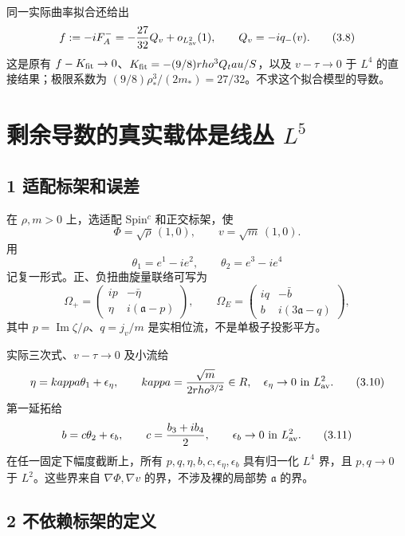 \documentclass[UTF8,11pt,openany,oneside,fontset=none]{ctexbook}
\begin{document}
同一实际曲率拟合还给出 \[
 f:=-iF_A^-=-\frac{27}{32}Q_v+o_{L^2_{\rm av}}(1),
 \qquad Q_v=-iq_-(v).
 \tag{3.8}\label{eq:r3:8}
\] 这是原有 \(f-K_{\rm fit}\to0\)、\(K_{\rm fit}=-(9/8)\rho^3Q_\tau/S\)，以及 \(v-\tau\to0\) 于 \(L^4\) 的直接结果；极限系数为 \((9/8)\rho_*^3/(2m_*)=27/32\)。不求这个拟合模型的导数。

\section{\texorpdfstring{剩余导数的真实载体是线丛 \(L^5\)}{剩余导数的真实载体是线丛 L\^{}5}}\label{ch3:ux5269ux4f59ux5bfcux6570ux7684ux771fux5b9eux8f7dux4f53ux662fux7ebfux4e1b-l5}

\subsection{1 适配标架和误差}\label{ch3:ux9002ux914dux6807ux67b6ux548cux8befux5dee}

在 \(\rho,m>0\) 上，选适配 Spin\(^c\) 和正交标架，使 \[
 \Phi=\sqrt\rho\,(1,0),\qquad v=\sqrt m\,(1,0).
\] 用 \[
 \theta_1=e^1-ie^2,\qquad \theta_2=e^3-ie^4
\] 记复一形式。正、负扭曲旋量联络可写为 \[
 \Omega_+=\begin{pmatrix}ip&-\bar\eta\\\eta&i(\mathfrak a-p)\end{pmatrix},
 \qquad
 \Omega_E=\begin{pmatrix}iq&-\bar b\\b&i(3\mathfrak a-q)\end{pmatrix},
 \tag{3.9}\label{eq:r3:9}
\] 其中 \(p=\operatorname{Im}\zeta/\rho\)、\(q=j_v/m\) 是实相位流，不是单极子投影平方。

实际三次式、\(v-\tau\to0\) 及小流给 \[
 \eta=\kappa\theta_1+\epsilon_\eta,
 \qquad \kappa=\frac{\sqrt m}{2\rho^{3/2}}\in\mathbb R,
 \quad \epsilon_\eta\to0\text{ in }L^2_{\rm av}.
 \tag{3.10}\label{eq:r3:10}
\] 第一延拓给 \[
 b=c\theta_2+\epsilon_b,\qquad
 c=\frac{b_3+ib_4}{2},\qquad \epsilon_b\to0\text{ in }L^2_{\rm av}.
 \tag{3.11}\label{eq:r3:11}
\] 在任一固定下幅度截断上，所有 \(p,q,\eta,b,c,\epsilon_\eta,\epsilon_b\) 具有归一化 \(L^4\) 界，且 \(p,q\to0\) 于 \(L^2\)。这些界来自 \(\nabla\Phi,\nabla v\) 的界，不涉及裸的局部势 \(\mathfrak a\) 的界。

\subsection{2 不依赖标架的定义}\label{ch3:ux4e0dux4f9dux8d56ux6807ux67b6ux7684ux5b9aux4e49}
\end{document}
